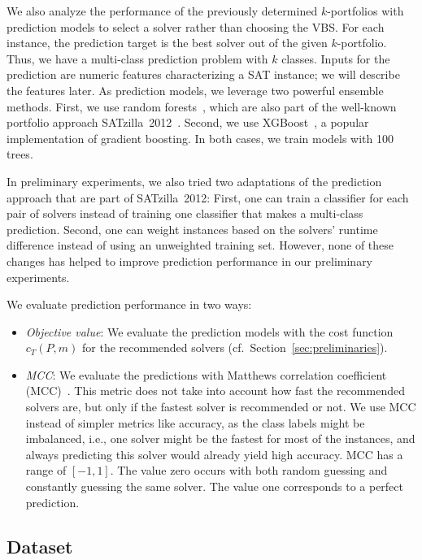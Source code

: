 \documentclass[a4paper,USenglish,pdfa]{lipics-v2021} %
\begin{document}
We also analyze the performance of the previously determined $k$-portfolios with prediction models to select a solver rather than choosing the VBS. 
For each instance, the prediction target is the best solver out of the given $k$-portfolio.
Thus, we have a multi-class prediction problem with $k$ classes.
Inputs for the prediction are numeric features characterizing a SAT instance; we will describe the features later. 
As prediction models, we leverage two powerful ensemble methods.
First, we use random forests~\cite{breiman2001random}, which are also part of the well-known portfolio approach SATzilla~2012~\cite{xu2012satzilla2012}.
Second, we use XGBoost~\cite{xgboost}, a popular implementation of gradient boosting.
In both cases, we train models with 100 trees.

In preliminary experiments, we also tried two adaptations of the prediction approach that are part of SATzilla~2012:
First, one can train a classifier for each pair of solvers instead of training one classifier that makes a multi-class prediction.
Second, one can weight instances based on the solvers' runtime difference instead of using an unweighted training set.
However, none of these changes has helped to improve prediction performance in our preliminary experiments.

We evaluate prediction performance in two ways:

\begin{itemize}
	\item \emph{Objective value}:
	We evaluate the prediction models with the cost function $c_{T}(P,m)$ for the recommended solvers (cf.~Section~\ref{sec:preliminaries}). 
	\item \emph{MCC}:
	We evaluate the predictions with Matthews correlation coefficient (MCC)~\cite{matthews1975comparison,gorodkin2004comparing}.
	This metric does not take into account how fast the recommended solvers are, but only if the fastest solver is recommended or not.
	We use MCC instead of simpler metrics like accuracy, as the class labels might be imbalanced, i.e., one solver might be the fastest for most of the instances, and always predicting this solver would already yield high accuracy.
	MCC has a range of $[-1,1]$. 
	The value zero occurs with both random guessing and constantly guessing the same solver.
	The value one corresponds to a perfect prediction.
\end{itemize}

\subsection{Dataset}
\end{document}
